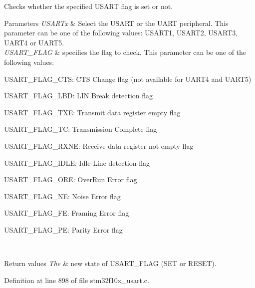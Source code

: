 Checks whether the specified U\+S\+A\+RT flag is set or not. 


\begin{DoxyParams}{Parameters}
{\em U\+S\+A\+R\+Tx} & Select the U\+S\+A\+RT or the U\+A\+RT peripheral. This parameter can be one of the following values\+: U\+S\+A\+R\+T1, U\+S\+A\+R\+T2, U\+S\+A\+R\+T3, U\+A\+R\+T4 or U\+A\+R\+T5. \\
\hline
{\em U\+S\+A\+R\+T\+\_\+\+F\+L\+AG} & specifies the flag to check. This parameter can be one of the following values\+: \begin{DoxyItemize}
\item U\+S\+A\+R\+T\+\_\+\+F\+L\+A\+G\+\_\+\+C\+TS\+: C\+TS Change flag (not available for U\+A\+R\+T4 and U\+A\+R\+T5) \item U\+S\+A\+R\+T\+\_\+\+F\+L\+A\+G\+\_\+\+L\+BD\+: L\+IN Break detection flag \item U\+S\+A\+R\+T\+\_\+\+F\+L\+A\+G\+\_\+\+T\+XE\+: Transmit data register empty flag \item U\+S\+A\+R\+T\+\_\+\+F\+L\+A\+G\+\_\+\+TC\+: Transmission Complete flag \item U\+S\+A\+R\+T\+\_\+\+F\+L\+A\+G\+\_\+\+R\+X\+NE\+: Receive data register not empty flag \item U\+S\+A\+R\+T\+\_\+\+F\+L\+A\+G\+\_\+\+I\+D\+LE\+: Idle Line detection flag \item U\+S\+A\+R\+T\+\_\+\+F\+L\+A\+G\+\_\+\+O\+RE\+: Over\+Run Error flag \item U\+S\+A\+R\+T\+\_\+\+F\+L\+A\+G\+\_\+\+NE\+: Noise Error flag \item U\+S\+A\+R\+T\+\_\+\+F\+L\+A\+G\+\_\+\+FE\+: Framing Error flag \item U\+S\+A\+R\+T\+\_\+\+F\+L\+A\+G\+\_\+\+PE\+: Parity Error flag \end{DoxyItemize}
\\
\hline
\end{DoxyParams}

\begin{DoxyRetVals}{Return values}
{\em The} & new state of U\+S\+A\+R\+T\+\_\+\+F\+L\+AG (S\+ET or R\+E\+S\+ET). \\
\hline
\end{DoxyRetVals}


Definition at line 898 of file stm32f10x\+\_\+usart.\+c.

\mbox{\label{group___u_s_a_r_t___private___functions_ga93d8f031241bcdbe938d091a85295445}} 
